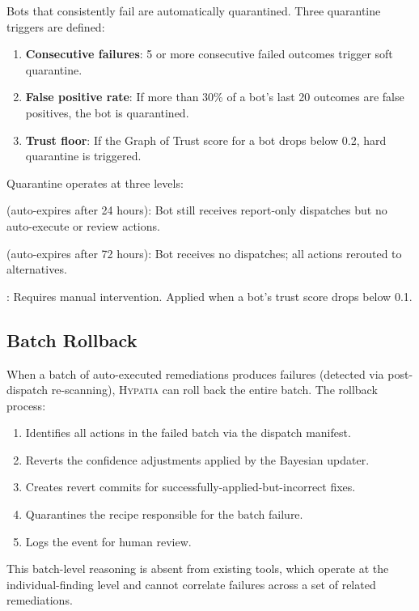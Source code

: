 \documentclass[11pt,a4paper]{article}
\begin{document}
Bots that consistently fail are automatically quarantined. Three quarantine triggers are defined:

\begin{enumerate}[nosep]
  \item \textbf{Consecutive failures}: 5 or more consecutive failed outcomes trigger soft quarantine.
  \item \textbf{False positive rate}: If more than 30\% of a bot's last 20 outcomes are false positives, the bot is quarantined.
  \item \textbf{Trust floor}: If the Graph of Trust score for a bot drops below 0.2, hard quarantine is triggered.
\end{enumerate}

Quarantine operates at three levels:
\begin{description}[nosep]
  \item[Soft] (auto-expires after 24 hours): Bot still receives report-only dispatches but no auto-execute or review actions.
  \item[Hard] (auto-expires after 72 hours): Bot receives no dispatches; all actions rerouted to alternatives.
  \item[Permanent]: Requires manual intervention. Applied when a bot's trust score drops below 0.1.
\end{description}

\subsection{Batch Rollback}

When a batch of auto-executed remediations produces failures (detected via post-dispatch re-scanning), \textsc{Hypatia} can roll back the entire batch. The rollback process:

\begin{enumerate}[nosep]
  \item Identifies all actions in the failed batch via the dispatch manifest.
  \item Reverts the confidence adjustments applied by the Bayesian updater.
  \item Creates revert commits for successfully-applied-but-incorrect fixes.
  \item Quarantines the recipe responsible for the batch failure.
  \item Logs the event for human review.
\end{enumerate}

This batch-level reasoning is absent from existing tools, which operate at the individual-finding level and cannot correlate failures across a set of related remediations.
\end{document}
